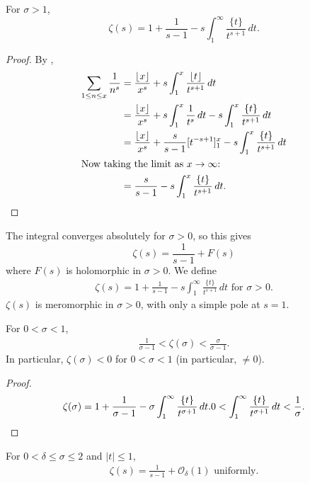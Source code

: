 \documentclass{article}
\newcommand{\bigO}{\mathcal{O}}
\DeclarePairedDelimiter\floor{\lfloor}{\rfloor}
\begin{document}
\begin{lemma}
  For $\sigma > 1$,
  \begin{equation*}
    \zeta(s) = 1 + \frac{1}{s-1} - s \int_1^\infty \frac{\{t\}}{t^{s+1}}\,dt.
  \end{equation*}
\end{lemma}
\begin{proof}
  By ,
  \begin{align*}
    \sum_{1 \leq n \leq x} \frac{1}{n^s} &= \frac{\floor{x}}{x^s} + s \int_1^x \frac{\floor{t}}{t^{s+1}}\,dt \\
    &= \frac{\floor{x}}{x^s} + s \int_1^x \frac{1}{t^{s}}\,dt - s \int_1^x \frac{\{t\}}{t^{s+1}}\,dt\\
    &= \frac{\floor{x}}{x^s} + \frac{s}{s-1} [t^{-s+1}]^x_1 - s \int_1^x \frac{\{t\}}{t^{s+1}}\,dt \\
    \shortintertext{Now taking the limit as $x \to \infty$:}
    &= \frac{s}{s-1} - s \int_1^x \frac{\{t\}}{t^{s+1}}\,dt. \qedhere
  \end{align*}
\end{proof}
The integral converges absolutely for $\sigma > 0$, so this gives
\begin{equation*}
  \zeta(s) = \frac{1}{s-1} + F(s)
\end{equation*}
where $F(s)$ is holomorphic in $\sigma>0$.
We define
\begin{align*}
  \zeta(s) = 1 + \frac{1}{s-1} - s \int_1^\infty \frac{\{t\}}{t^{s+1}}\,dt \text{ for } \sigma > 0.
\end{align*}
$\zeta(s)$ is meromorphic in $\sigma>0$, with only a simple pole at $s=1$.
\begin{cor}
  For $0 < \sigma < 1$,
  \begin{align*}
    \frac{1}{\sigma-1} < \zeta(\sigma) < \frac{\sigma}{\sigma-1}.
  \end{align*}
  In particular, $\zeta(\sigma) < 0$ for $0 < \sigma < 1$ (in particular, $\neq 0$).
\end{cor}
\begin{proof}
  \begin{gather*}
    \zeta(\sigma) = 1 + \frac{1}{\sigma-1} - \sigma \int_1^\infty \frac{\{t\}}{t^{\sigma+1}} \, dt.
    0 < \int_1^\infty \frac{\{t\}}{t^{\sigma+1}}\,dt < \frac{1}{\sigma}. \qedhere
  \end{gather*}
\end{proof}
\begin{cor}
  For $0 < \delta \leq \sigma \leq 2$ and $|t| \leq 1$,
  \begin{align*}
    \zeta(s) = \frac{1}{s-1} + \bigO_\delta(1) \text{ uniformly}.
  \end{align*}
\end{cor}
\end{document}
